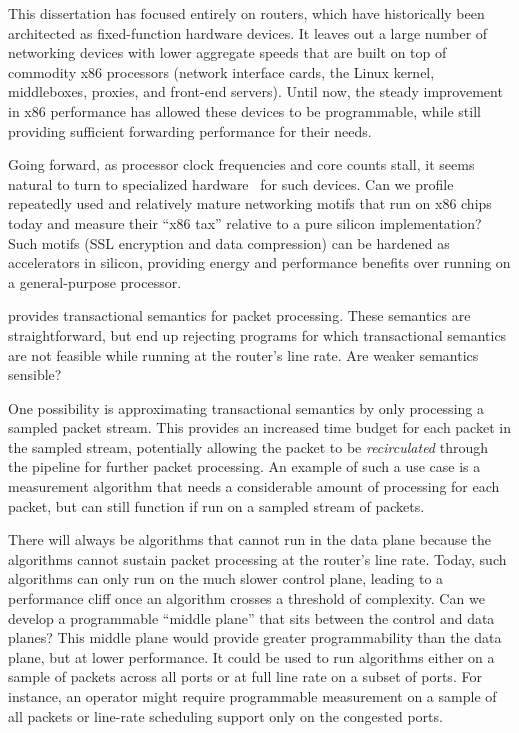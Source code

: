  This dissertation has focused entirely on
routers, which have historically been architected as fixed-function hardware
devices. It leaves out a large number of networking devices with lower
aggregate speeds that are built on top of commodity x86 processors (\eg network
interface cards, the Linux kernel, middleboxes, proxies, and front-end
servers). Until now, the steady improvement in x86 performance has allowed
these devices to be programmable, while still providing sufficient forwarding
performance for their needs.

Going forward, as processor clock frequencies and core counts stall, it seems
natural to turn to specialized hardware~\cite{dark_silicon, four_horsemen} for
such devices. Can we profile repeatedly used and relatively mature networking
motifs that run on x86 chips today and measure their ``x86 tax'' relative to a
pure silicon implementation? Such motifs (\eg SSL encryption and data
compression) can be hardened as accelerators in silicon, providing energy and
performance benefits over running on a general-purpose processor.

 \pktlanguage provides
transactional semantics for packet processing. These semantics are
straightforward, but end up rejecting programs for which transactional
semantics are not feasible while running at the router's line rate.  Are weaker
semantics sensible?

One possibility is approximating transactional semantics by only processing a
sampled packet stream.  This provides an increased time budget for each packet
in the sampled stream, potentially allowing the packet to be {\em recirculated}
through the pipeline for further packet processing. An example of such a use
case is a measurement algorithm that needs a considerable amount of processing
for each packet, but can still function if run on a sampled stream of packets.

 There will always be algorithms that
cannot run in the data plane because the algorithms cannot sustain packet
processing at the router's line rate. Today, such algorithms can only run on
the much slower control plane, leading to a performance cliff once an algorithm
crosses a threshold of complexity. Can we develop a programmable ``middle
plane'' that sits between the control and data planes? This middle plane would
provide greater programmability than the data plane, but at lower performance.
It could be used to run algorithms either on a sample of packets across all
ports or at full line rate on a subset of ports. For instance, an operator
might require programmable measurement on a sample of all packets or line-rate
scheduling support only on the congested ports.

